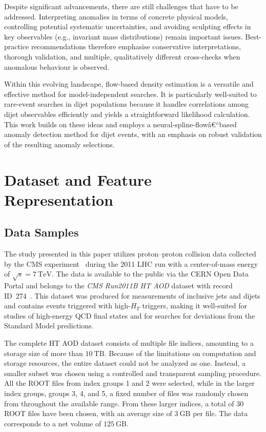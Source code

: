\documentclass[11pt,a4paper,twocolumn]{article}
\begin{document}
Despite significant advancements, there are still challenges that have to be addressed. Interpreting anomalies in terms of concrete physical models, controlling potential systematic uncertainties, and avoiding sculpting effects in key observables (e.g., invariant mass distributions) remain important issues. Best-practice recommendations therefore emphasise conservative interpretations, thorough validation, and multiple, qualitatively different cross-checks when anomalous behaviour is observed.

Within this evolving landscape, flow-based density estimation is a versatile and effective method for model-independent searches. It is particularly well-suited to rare-event searches in dijet populations because it handles correlations among dijet observables efficiently and yields a straightforward likelihood calculation. This work builds on these ideas and employs a neural-spline-flowâ€“based anomaly detection method for dijet events, with an emphasis on robust validation of the resulting anomaly selections.

\section{Dataset and Feature Representation}

\subsection{Data Samples}

The study presented in this paper utilizes proton--proton collision data collected by the CMS experiment~\cite{CMS2008JINST} during the 2011 LHC run with a center-of-mass energy of $\sqrt{s} = 7~\mathrm{TeV}$. The data is available to the public via the CERN Open Data Portal and belongs to the \emph{CMS Run2011B HT AOD} dataset with record ID~274~\cite{CMS2011BHT}. This dataset was produced for measurements of inclusive jets and dijets and contains events triggered with high-$H_T$ triggers, making it well-suited for studies of high-energy QCD final states and for searches for deviations from the Standard Model predictions.

The complete HT AOD dataset consists of multiple file indices, amounting to a storage size of more than $10~\mathrm{TB}$. Because of the limitations on computation and storage resources, the entire dataset could not be analyzed as one. Instead, a smaller subset was chosen using a controlled and transparent sampling procedure. All the ROOT files from index groups 1 and 2 were selected, while in the larger index groups, groups 3, 4, and 5, a fixed number of files was randomly chosen from throughout the available range. From these larger indices, a total of $30$ ROOT files have been chosen, with an average size of $3~\mathrm{GB}$ per file. The data corresponds to a net volume of $125~\mathrm{GB}$.
\end{document}
